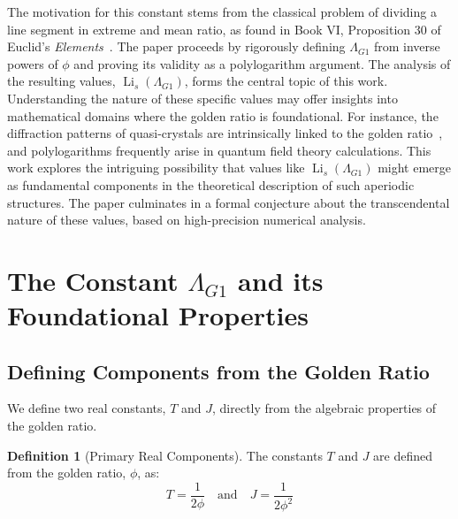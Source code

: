 \documentclass{amsart}
\theoremstyle{plain}
\theoremstyle{definition}
\newtheorem{definition}[theorem]{Definition}
\theoremstyle{remark}
\DeclareMathOperator{\Li}{Li} %
\newcommand{\LambdaG}{\Lambda_{G1}}
\newcommand{\phiG}{\phi}
\begin{document}
The motivation for this constant stems from the classical problem of dividing a line segment in extreme and mean ratio, as found in Book VI, Proposition 30 of Euclid's \textit{Elements}~\cite{Euclid}. The paper proceeds by rigorously defining $\LambdaG$ from inverse powers of $\phiG$ and proving its validity as a polylogarithm argument. The analysis of the resulting values, $\Li_s(\LambdaG)$, forms the central topic of this work. Understanding the nature of these specific values may offer insights into mathematical domains where the golden ratio is foundational. For instance, the diffraction patterns of quasi-crystals are intrinsically linked to the golden ratio~\cite{Levine1984}, and polylogarithms frequently arise in quantum field theory calculations. This work explores the intriguing possibility that values like $\Li_s(\LambdaG)$ might emerge as fundamental components in the theoretical description of such aperiodic structures. The paper culminates in a formal conjecture about the transcendental nature of these values, based on high-precision numerical analysis.

\section{The Constant \texorpdfstring{$\LambdaG$}{Lambda\_G1} and its Foundational Properties}

\subsection{Defining Components from the Golden Ratio}
We define two real constants, $T$ and $J$, directly from the algebraic properties of the golden ratio.
\begin{definition}[Primary Real Components]
The constants $T$ and $J$ are defined from the golden ratio, $\phiG$, as:
\[ T = \frac{1}{2\phiG} \quad \text{and} \quad J = \frac{1}{2\phiG^2} \]
\end{definition}
\end{document}
